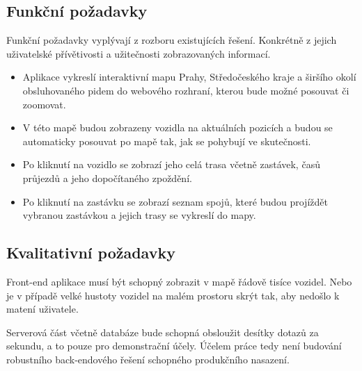 \subsection{Funkční požadavky}


Funkční požadavky vyplývají z rozboru existujících řešení. Konkrétně z jejich uživatelské přívětivosti a užitečnosti zobrazovaných informací.


\begin{itemize}


\item Aplikace vykreslí interaktivní mapu Prahy, Středočeského kraje a širšího okolí obsluhovaného \gls{pid}em do webového rozhraní, kterou bude možné posouvat či zoomovat.


\item V této mapě budou zobrazeny vozidla na aktuálních pozicích a budou se automaticky posouvat po mapě tak, jak se pohybují ve skutečnosti.


\item Po kliknutí na vozidlo se zobrazí jeho celá trasa včetně zastávek, časů průjezdů a jeho dopočítaného zpoždění.


\item Po kliknutí na zastávku se zobrazí seznam spojů, které budou projíždět vybranou zastávkou a jejich trasy se vykreslí do mapy.


\end{itemize}


\subsection{Kvalitativní požadavky}


Front-end aplikace musí být schopný zobrazit v mapě řádově tisíce vozidel. Nebo je v případě velké hustoty vozidel na malém prostoru skrýt tak, aby nedošlo k matení uživatele.


\bigbreak


Serverová část včetně databáze bude schopná obsloužit desítky dotazů za sekundu, a to pouze pro demonstrační účely. Účelem práce tedy není budování robustního back-endového řešení schopného produkčního nasazení.

